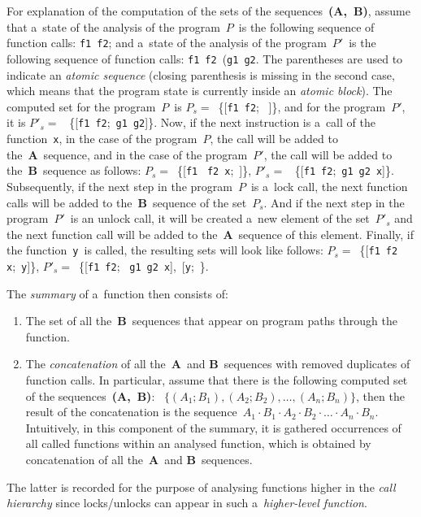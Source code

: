 \newpage
\begin{example}
    For explanation of the computation of the sets of the
    sequences~\textbf{(A,~B)}, assume that a~state of the analysis of
    the program~$ P $~is the following sequence of function calls:
    \texttt{f1}~\texttt{f2}; and a~state of the analysis of the
    program~$ P' $~is the following sequence of function calls:
    \texttt{f1}~\texttt{f2}~(\texttt{g1}~\texttt{g2}. The parentheses
    are used to indicate an \emph{atomic sequence} (closing parenthesis is
    missing in the second case, which means that the program state is
    currently inside an \emph{atomic block}). The computed set for the
    program~$ P $~is $ P_s = $~\{[\texttt{f1}~\texttt{f2};~%
    \textvisiblespace]\}, and for the program~$ P' $, it is $ P'_s = $~%
    \{[\texttt{f1}~\texttt{f2};~\texttt{g1}~\texttt{g2}]\}. Now, if the next
    instruction is a~call of the function~\texttt{x}, in the case of the
    program~$ P $, the call will be added to the~\textbf{A}~sequence, and in
    the case of the program~$ P' $, the call will be added to
    the~\textbf{B}~sequence as follows: $ P_s = $~\{[\texttt{f1}~%
    \texttt{f2}~\texttt{x};~\textvisiblespace]\}, $ P'_s = $~%
    \{[\texttt{f1}~\texttt{f2};~\texttt{g1}~\texttt{g2}~\texttt{x}]\}.
    Subsequently, if the next step in the program~$ P $~is a~lock call,
    the next function calls will be added to the~\textbf{B}~sequence of the
    set~$ P_s $. And if the next step in the program~$ P' $~is an unlock
    call, it will be created a~new element of the set~$ P'_s $ and the
    next function call will be added to the~\textbf{A}~sequence of this element.
    Finally, if the function~\texttt{y}~is called, the resulting sets
    will look like follows: $ P_s = $~\{[\texttt{f1}~\texttt{f2}~%
    \texttt{x};~\texttt{y}]\}, $ P'_s = $~\{[\texttt{f1}~\texttt{f2};~%
    \texttt{g1}~\texttt{g2}~\texttt{x}],~[\texttt{y};~\textvisiblespace\}.
\end{example}

The \emph{summary} of a~function then consists of:
\begin{enumerate}[label={(\roman*)}]
    \item
        The set of all the~\textbf{B}~sequences that appear on program
        paths through the function.

    \item
        The \emph{concatenation} of all
        the~\textbf{A}~and \textbf{B}~sequences with removed duplicates
        of function calls. In particular, assume that there is the
        following computed set of the sequences~\textbf{(A,~B)}:~%
        $ \{(A_1; B_1), (A_2; B_2), \ldots, (A_n; B_n)\} $, then
        the result of the concatenation is the sequence~$ A_1{\cdot}B_1%
        {\cdot}A_2{\cdot}B_2{\cdot} \ldots {\cdot}A_n{\cdot}B_n $.
        Intuitively, in this component of the summary, it is gathered
        occurrences of all called functions within an analysed function,
        which is obtained by concatenation of all
        the~\textbf{A}~and \textbf{B}~sequences.
\end{enumerate}
The latter is recorded for the purpose of analysing functions higher in the
\emph{call hierarchy} since locks/unlocks can appear in such
a~\emph{higher-level function}.

